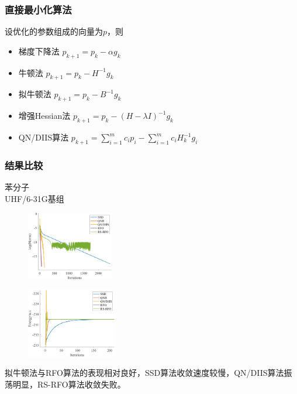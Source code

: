 \documentclass[10pt,aspectratio=43,mathserif,UTF8]{beamer}
\begin{document}
\begin{frame}
	\frametitle{直接最小化算法}
	设优化的参数组成的向量为$p$，则
	\begin{itemize}
		\item 梯度下降法\qquad\quad
		$p_{k+1} = p_{k} -\alpha g_k$\\
		\item 牛顿法\qquad\qquad\quad
		$p_{k+1} = p_{k} -H^{-1} g_k$\\
		\item 拟牛顿法\qquad\qquad
		$p_{k+1} = p_{k} -B^{-1} g_k$\\
		\item 增强Hessian法\qquad
		$p_{k+1} = p_{k} -(H-\lambda I)^{-1} g_k$\\
		\item QN/DIIS算法\qquad\quad
		$p_{k+1} = \sum_{i=1}^{m} c_i p_{i} -\sum_{i=1}^{m} c_i H_k^{-1} g_i$
	\end{itemize}
	
	
\end{frame}


\begin{frame}
	\frametitle{结果比较}
	苯分子\\
	UHF/6-31G基组
	\begin{figure}[ht!]
		\centering
		\begin{minipage}{0.4\linewidth}
			\centering
			\includegraphics[height=3cm]{figure/benzene/NORM2.png}
			\label{fig:benzene:lognorm}
		\end{minipage}
		\begin{minipage}{0.4\linewidth}
			\centering
			\includegraphics[height=3cm]{figure/benzene/E3.png}
			\label{fig:benzene:E1}
		\end{minipage}
	\end{figure}
	拟牛顿法与RFO算法的表现相对良好，SSD算法收敛速度较慢，QN/DIIS算法振荡明显，RS-RFO算法收敛失败。
\end{frame}
\end{document}
